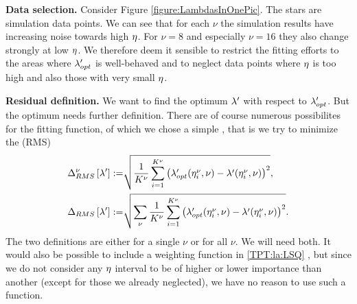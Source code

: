\documentclass[8.5pt,twoside,twocolumn]{article}
\theoremstyle{standard}
\begin{document}
\textbf{Data selection.} Consider Figure \ref{figure:LambdasInOnePic}. The stars are simulation data
points. We can see that for each $\nu$ the simulation results have increasing noise
towards high $\eta$. For $\nu=8$ and especially $\nu=16$ they also change strongly
at low $\eta$. We therefore deem it sensible to restrict the fitting efforts to the
areas where $\lambda_{opt}'$ is well-behaved and to neglect data points where $\eta$ is too
high and also those with very small $\eta$. 
 
\textbf{Residual definition.} We want to find the optimum $\lambda'$ with respect to $\lambda_{opt}'$. 
But the optimum needs further definition. There are of course numerous possibilites
for the fitting function, of which we chose a simple , that
is we try to minimize the  (RMS) 
\newcommand\LS{\Dl_{RMS}}
\begin{subequations}
\label{TPT:la:LSQ}
\begin{align}
\LS^\nu\ed{\la'}:=&\sqrt{\frac 1 {K^\nu} \sum_{i=1}^{K^\nu} \rb{\lao'(\enui,\nu)-\la'(\enui,\nu)}^2},
\label{TPT:la:LSQ1}\\
\LS\ed{\la'}:=&\sqrt{\sum_{\nu}\frac 1 {K^\nu}\sum_{i=1}^{K^\nu} \rb{\lao'(\enui,\nu)-\la'(\enui,\nu)}^2}.
\label{TPT:la:LSQ2} 
\end{align} 
\end{subequations}
The two definitions are either for a single $\nu$ or for all $\nu$. We will need
both. It would also be possible to include a weighting function in
\eqref{TPT:la:LSQ} , but since
we do not consider any $\eta$ interval to be of higher or lower importance than
another (except for those we already neglected), we have no reason to use such a
function.
\end{document}
